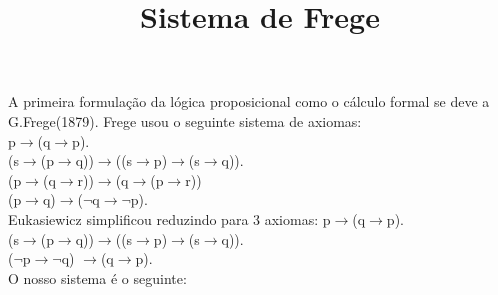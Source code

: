 \documentclass[12pt]{report}
\title{Sistema de Frege}
\begin{document}
\maketitle
A primeira formulação da lógica proposicional como o cálculo formal se deve a G.Frege(1879). Frege usou o seguinte sistema de axiomas:\\
p$\rightarrow$(q$\rightarrow$p).\\
(s$\rightarrow$(p$\rightarrow$q))$\rightarrow$((s$\rightarrow$p)$\rightarrow$(s$\rightarrow$q)).\\
(p$\rightarrow$(q$\rightarrow$r))$\rightarrow$(q$\rightarrow$(p$\rightarrow$r))\\
(p$\rightarrow$q)$\rightarrow$($\neg$q$\rightarrow$$\neg$p).\\
Eukasiewicz simplificou reduzindo para 3 axiomas:
p$\rightarrow$(q$\rightarrow$p).\\
(s$\rightarrow$(p$\rightarrow$q))$\rightarrow$((s$\rightarrow$p)$\rightarrow$(s$\rightarrow$q)).\\
($\neg$p$\rightarrow$$\neg$q) $\rightarrow$(q$\rightarrow$p).\\
O nosso sistema é o seguinte:
\end{document}
